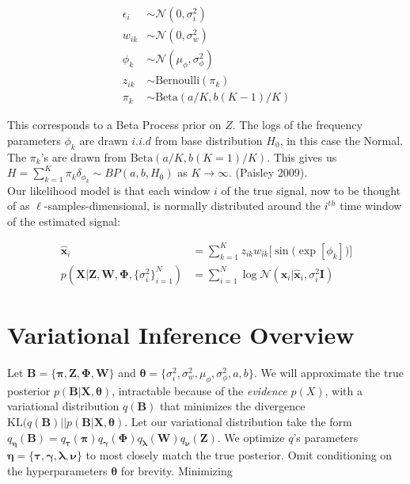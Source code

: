 \documentclass[11pt]{article}
\theoremstyle{definition}
\theoremstyle{plain}
\newcommand{\Beta}{\text{Beta}}
\newcommand{\Bernoulli}{\text{Bernoulli}}
\newcommand{\KL}{\text{KL}}
\begin{document}
\begin{align*}
    \epsilon_i &\sim \mathcal{N}(0, \sigma^2_i)\\
    w_{ik} &\sim \mathcal{N}(0, \sigma^2_w)\\
    \phi_k &\sim \mathcal{N}(\mu_{\phi}, \sigma^2_{\phi})\\
    z_{ik} &\sim \Bernoulli(\pi_k)\\
    \pi_k &\sim \Beta(a/K, b(K-1)/K)
\end{align*}

\noindent This corresponds to a Beta Process prior on $Z$. The logs of the frequency parameters 
$\phi_k$ are drawn $i.i.d$ from base distribution $H_0$, in this case the Normal.
The $\pi_k$'s are drawn from $\Beta(a/K,b(K=1)/K)$. This gives us $H = \sum_{k=1}^K \pi_k \delta_{\phi_k} \sim BP(a,b,H_0)$ as $K \rightarrow \infty$. (Paisley 2009).\\

\noindent Our likelihood model is that each window $i$ of the true signal, now to be thought of as $\ell$-samples-dimensional, is normally distributed around the $i^{th}$
time window of the estimated signal:

\begin{align*}
    \hat{\mathbf{x}}_i &= \sum_{k=1}^K z_{ik}w_{ik}\big[\sin\big(\exp[\phi_k]\big)\big]\\
    p(\mathbf{X} |\mathbf{Z}, \mathbf{W}, \boldsymbol{\Phi},\{\sigma^2_i\}_{i=1}^N) &= \sum_{i=1}^N \log \mathcal{N}(\mathbf{x}_i | \hat{\mathbf{x}}_i, \sigma^2_i\mathbf{I})
\end{align*}


\section{Variational Inference Overview}

\noindent Let $\mathbf{B} = \{\boldsymbol{\pi}, \mathbf{Z}, \mathbf{\Phi}, \mathbf{W}\}$ and 
$\boldsymbol{\theta} = \{\sigma^2_i, \sigma^2_w, \mu_{\phi}, \sigma^2_\phi, a, b \}$. 
We will approximate the true posterior $p(\mathbf{B}|\mathbf{X},\boldsymbol{\theta})$, intractable because of the \textit{evidence} $p(X)$,
with a variational distribution $q(\mathbf{B})$ that minimizes the divergence $\KL(q(\mathbf{B}) || p(\mathbf{B}|\mathbf{X},\boldsymbol{\theta})$. 
Let our variational distribution take the form $q_{\boldsymbol{\eta}}(\mathbf{B}) = q_{\boldsymbol{\tau}}(\boldsymbol{\pi}) q_{\boldsymbol{\gamma}}(\boldsymbol{\Phi}) 
q_{\boldsymbol{\lambda}}(\mathbf{W}) q_{\boldsymbol{\nu}}(\mathbf{Z})$. We optimize $q$'s parameters $\boldsymbol{\eta} = \{\boldsymbol{\tau}, \boldsymbol{\gamma}, 
\boldsymbol{\lambda}, \boldsymbol{\nu}\}$ to most closely match the true posterior. Omit conditioning on the hyperparameters $\boldsymbol{\theta}$ for brevity. Minimizing 
\end{document}

